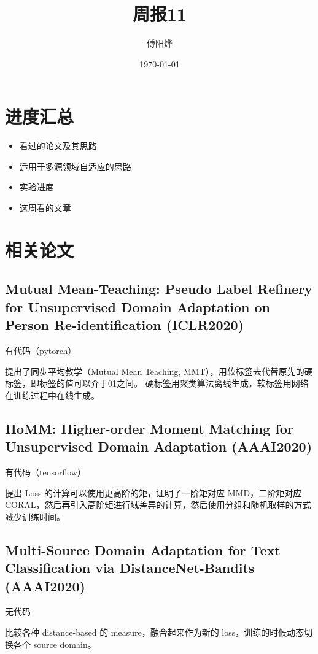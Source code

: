 \documentclass[UTF8]{ctexart}
\title{周报11}
\author{傅阳烨}
\date{\today}
\begin{document}
\maketitle
\section{进度汇总}
\begin{itemize}
    \item 看过的论文及其思路
    \item 适用于多源领域自适应的思路
    \item 实验进度
    \item 这周看的文章
\end{itemize}

\section{相关论文}

\subsection{Mutual Mean-Teaching: Pseudo Label Refinery for Unsupervised Domain Adaptation on Person Re-identification (ICLR2020)}

有代码（pytorch）

提出了同步平均教学（Mutual Mean Teaching, MMT），用软标签去代替原先的硬标签，即标签的值可以介于01之间。
硬标签用聚类算法离线生成，软标签用网络在训练过程中在线生成。

\subsection{HoMM: Higher-order Moment Matching for Unsupervised Domain Adaptation (AAAI2020)}

有代码（tensorflow）

提出 Loss 的计算可以使用更高阶的矩，证明了一阶矩对应 MMD，二阶矩对应 CORAL，然后再引入高阶矩进行域差异的计算，然后使用分组和随机取样的方式减少训练时间。

\subsection{Multi-Source Domain Adaptation for Text Classification via DistanceNet-Bandits (AAAI2020)}

无代码

比较各种 distance-based 的 measure，融合起来作为新的 loss，训练的时候动态切换各个 source domain。
\end{document}
